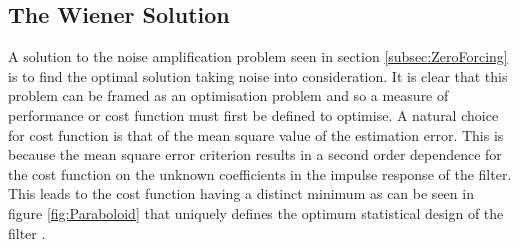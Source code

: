 \subsection{The Wiener Solution}
A solution to the noise amplification problem seen in %
section \ref{subsec:ZeroForcing} is to find the optimal %
solution taking noise into consideration. It is clear that %
this problem can be framed as an optimisation problem %
and so a measure of performance or cost function must %
first be defined to optimise. A natural choice for cost function %
is that of the mean square value of the estimation error. This %
is because the mean square error criterion results in a %
second order dependence for the cost function on the %
unknown coefficients in the impulse response of %
the filter. This leads to the cost function having a distinct %
minimum as can be seen in figure \ref{fig:Paraboloid} %
that uniquely defines the optimum %
statistical design of the filter \cite{Hay02}.
